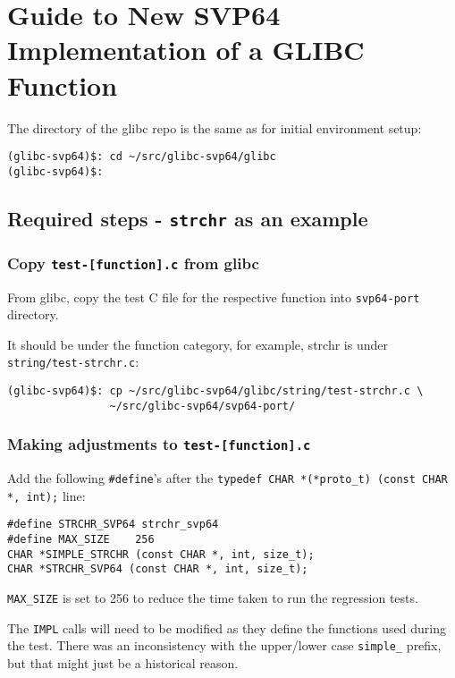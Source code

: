\section{Guide to New SVP64 Implementation of a GLIBC Function}
\label{sec:adding_new_func}

The directory of the glibc repo is the same as for initial environment setup:

\begin{verbatim}
(glibc-svp64)$: cd ~/src/glibc-svp64/glibc
(glibc-svp64)$:
\end{verbatim}

\subsection{Required steps - \texttt{strchr} as an example}

\subsubsection{Copy \texttt{test-[function].c} from glibc}

From glibc, copy the test C file for the respective function
into \texttt{svp64-port} directory.

It should be under the function category, for example, strchr is
under \texttt{string/test-strchr.c}:

\begin{verbatim}
(glibc-svp64)$: cp ~/src/glibc-svp64/glibc/string/test-strchr.c \
                ~/src/glibc-svp64/svp64-port/
\end{verbatim}

\subsubsection{Making adjustments to \texttt{test-[function].c}}

Add the following \texttt{\#define}'s after the
\texttt{typedef CHAR *(*proto\_t) (const CHAR *, int);} line:

\begin{verbatim}
#define STRCHR_SVP64 strchr_svp64
#define MAX_SIZE    256
CHAR *SIMPLE_STRCHR (const CHAR *, int, size_t);
CHAR *STRCHR_SVP64 (const CHAR *, int, size_t);
\end{verbatim}

\texttt{MAX\_SIZE} is set to 256 to reduce the time taken to run
the regression tests.

The \texttt{IMPL} calls will need to be modified as they define the
functions used during the test. There was an inconsistency with the
upper/lower case \texttt{simple\_} prefix, but that might just be a
historical reason.


